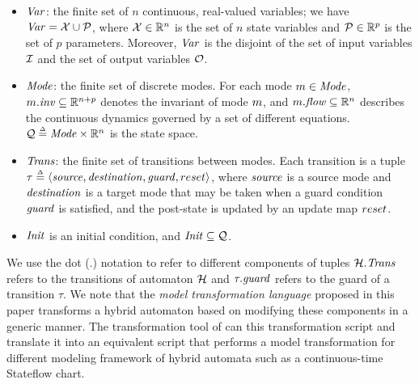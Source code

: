 %
\begin{itemize}[leftmargin= 2em]
%
\item ${\mathit{Var}}$: the finite set of $n$ continuous, real-valued variables; we have ${\mathit{Var}} = {\mathcal X} \cup {\mathcal P}$, where ${\mathcal X} \in \mathbb{R}^n$ is the set of $n$ state variables and ${\mathcal P}\in\mathbb{R}^p$ is the set of $p$ parameters. Moreover, ${\mathit{Var}}$ is the disjoint of the set of input variables ${\mathcal I}$ and the set of output variables ${\mathcal O}$.
\item ${\mathit{Mode}}$: the finite set of discrete modes. For each mode $m \in {\mathit{Mode}}$, $m.{\mathit{inv}} \subseteq \mathbb{R}^{n+p}$ denotes the invariant of mode $m$, and $m.{\mathit{flow}} \subseteq \mathbb{R}^n$ describes the continuous dynamics governed by a set of different equations. ${\mathcal Q} \mathrel{\stackrel{\scriptscriptstyle\Delta}{=}} {\mathit{Mode}} \times \mathbb{R}^n$ is the state space.
\item ${\mathit{Trans}}$: the finite set of transitions between modes.
%
Each transition is a tuple $\tau \mathrel{\stackrel{\scriptscriptstyle\Delta}{=}} \left\langle\mathit{source}, \mathit{destination}, \mathit{guard}, reset\right\rangle$, where $\mathit{source}$ is a source mode and $\mathit{destination}$ is a target mode that may be taken when a guard condition $\mathit{guard}$ is satisfied, and the post-state is updated by an update map $reset$. 
%
%
%
\item ${\mathit{Init}}$ is an initial condition, and ${\mathit{Init}} \subseteq {\mathcal Q}$.
\end{itemize}
%
We use the dot (.) notation to refer to different components of tuples \eg ${\mathcal H}.{\mathit{Trans}}$ refers to the transitions of automaton ${\mathcal H}$ and $\tau.\mathit{guard}$ refers to the guard of a transition $\tau$. %
%
We note that the \emph{model transformation language} proposed in this paper transforms a hybrid automaton based on modifying these components in a generic manner. The transformation tool of \toolreaffirm can this transformation script and translate it into an equivalent script that performs a model transformation for different modeling framework of hybrid automata such as a continuous-time Stateflow chart.
%

